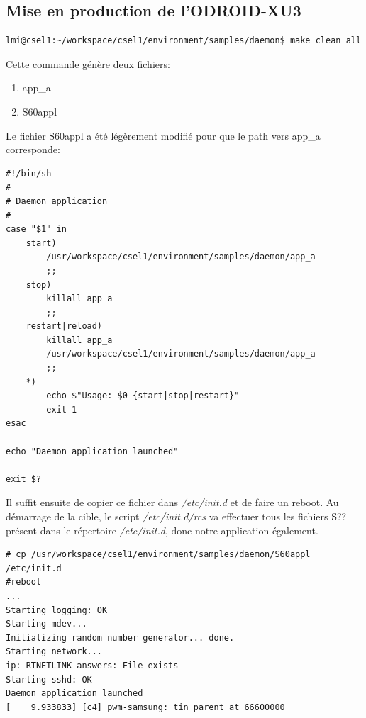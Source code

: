 \subsection{Mise en production de l'ODROID-XU3}
\begin{lstlisting}
lmi@csel1:~/workspace/csel1/environment/samples/daemon$ make clean all
\end{lstlisting}
Cette commande génère deux fichiers:
\begin{enumerate}
	\item app\_a
	\item S60appl
\end{enumerate}
Le fichier S60appl a été légèrement modifié pour que le path vers app\_a corresponde:
\begin{lstlisting}
#!/bin/sh
#
# Daemon application
#
case "$1" in
	start)
		/usr/workspace/csel1/environment/samples/daemon/app_a
		;;
	stop)
		killall app_a
		;;
	restart|reload)
		killall app_a
		/usr/workspace/csel1/environment/samples/daemon/app_a
		;;
	*)
		echo $"Usage: $0 {start|stop|restart}"
		exit 1
esac

echo "Daemon application launched"

exit $?
\end{lstlisting}
Il suffit ensuite de copier ce fichier dans \textit{/etc/init.d} et de faire un reboot. Au démarrage de la cible, le script \textit{/etc/init.d/rcs} va effectuer tous les fichiers S?? présent dans le répertoire \textit{/etc/init.d}, donc notre application également.
\begin{lstlisting}
# cp /usr/workspace/csel1/environment/samples/daemon/S60appl /etc/init.d
#reboot
...
Starting logging: OK                                                            
Starting mdev...                                                                
Initializing random number generator... done.                                   
Starting network...                                                             
ip: RTNETLINK answers: File exists                                              
Starting sshd: OK                                                               
Daemon application launched                                                     
[    9.933833] [c4] pwm-samsung: tin parent at 66600000  
\end{lstlisting}
